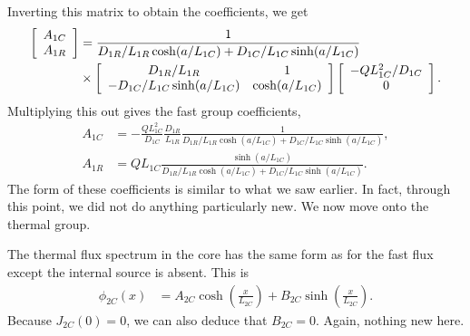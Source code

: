 Inverting this matrix to obtain the coefficients, we get
\begin{align}
  \left[ \begin{array}{c} A_{1C} \\ A_{1R} \\ \end{array} \right] &=
  \frac{1}{ D_{1R}/L_{1R} \cosh(a/L_{1C}) + D_{1C}/L_{1C} \sinh(a/L_{1C}) } \nonumber \\
  &\times \left[ \begin{array}{c c} 
  D_{1R}/L_{1R} 					& 1				\\
  -D_{1C}/L_{1C} \sinh(a/L_{1C})	& \cosh(a/L_{1C})		\\ \end{array} \right]
  \left[ \begin{array}{c} -Q L_{1C}^2/D_{1C} \\ 0 \\ \end{array} \right] .
\end{align}
Multiplying this out gives the fast group coefficients,
\begin{subequations}
\begin{align}
  A_{1C} &= -\frac{Q L_{1C}^2}{D_{1C}} \frac{D_{1R}}{L_{1R}} \frac{1}{ D_{1R}/L_{1R} \cosh(a/L_{1C}) + D_{1C}/L_{1C} \sinh(a/L_{1C}) }, \\
  A_{1R} &=  Q L_{1C} \frac{\sinh(a/L_{1C})}{ D_{1R}/L_{1R} \cosh(a/L_{1C}) + D_{1C}/L_{1C} \sinh(a/L_{1C}) } .
\end{align}
\end{subequations}
The form of these coefficients is similar to what we saw earlier. In fact, through this point, we did not do anything particularly new. We now move onto the thermal group.

The thermal flux spectrum in the core has the same form as for the fast flux except the internal source is absent. This is
\begin{align}
  \phi_{2C}(x) &= A_{2C} \cosh\left( \frac{x}{L_{2C}} \right)    + B_{2C} \sinh\left( \frac{x}{L_{2C}} \right) . 
\end{align}
Because $J_{2C}(0) = 0$, we can also deduce that $B_{2C} = 0$. Again, nothing new here. 


